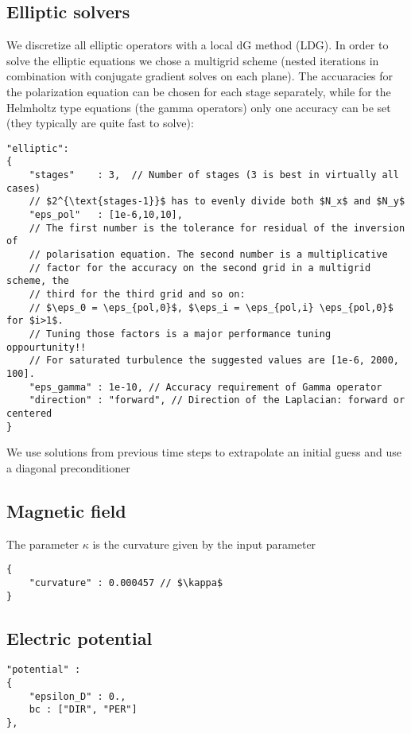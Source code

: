 \subsection{Elliptic solvers}
We discretize all elliptic operators with a local dG method (LDG).  In order to
solve the elliptic equations we chose a multigrid scheme (nested iterations in
combination with conjugate gradient solves on each plane). The accuaracies for
the polarization equation can be chosen for each stage separately, while for
the Helmholtz type equations (the gamma operators) only
one accuracy can be set (they typically are quite fast to solve):
\begin{verbatim}
"elliptic":
{
    "stages"    : 3,  // Number of stages (3 is best in virtually all cases)
    // $2^{\text{stages-1}}$ has to evenly divide both $N_x$ and $N_y$
    "eps_pol"   : [1e-6,10,10],
    // The first number is the tolerance for residual of the inversion of
    // polarisation equation. The second number is a multiplicative
    // factor for the accuracy on the second grid in a multigrid scheme, the
    // third for the third grid and so on:
    // $\eps_0 = \eps_{pol,0}$, $\eps_i = \eps_{pol,i} \eps_{pol,0}$  for $i>1$.
    // Tuning those factors is a major performance tuning oppourtunity!!
    // For saturated turbulence the suggested values are [1e-6, 2000, 100].
    "eps_gamma" : 1e-10, // Accuracy requirement of Gamma operator
    "direction" : "forward", // Direction of the Laplacian: forward or centered
}
\end{verbatim}
\begin{tcolorbox}[title=Note]
    We use solutions from previous time steps to extrapolate an initial guess
    and use a diagonal preconditioner
\end{tcolorbox}
\subsection{Magnetic field}
The parameter $\kappa$ is the curvature given by the input parameter
\begin{verbatim}
{
    "curvature" : 0.000457 // $\kappa$
}
\end{verbatim}
\subsection{Electric potential}
\begin{verbatim}
"potential" :
{
    "epsilon_D" : 0.,
    bc : ["DIR", "PER"]
},
\end{verbatim}

